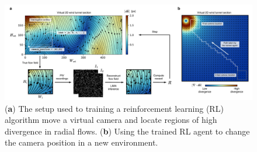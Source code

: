 \documentclass[a4paper,fleqn]{cas-dc}
\begin{document}
\begin{figure}[t]
\centering
\vspace{-0.4 in}
\includegraphics[width=\textwidth]{RL.pdf}
\vspace{10 pt}
\caption{\footnotesize (\textbf{a}) The setup used to training a reinforcement learning (RL) algorithm move a virtual camera and locate regions of high divergence in radial flows. (\textbf{b}) Using the trained RL agent to change the camera position in a new environment.}
\label{fig:RL}
\end{figure}
\end{document}
